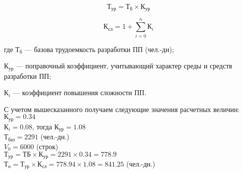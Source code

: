 \begin{equation}
    \textrm{Т}_{\textrm{ур}} = \textrm{Т}_{\textrm{б}} \times{} \textrm{К}_{\textrm{ур}}
\end{equation}

\begin{equation}
    \textrm{К}_{\textrm{сл}} = 1 + \sum_{i=0}^{n}\textrm{К}_i
\end{equation}
\begin{ESKDexplanation}
    \item[где ]{} $\textrm{Т}_{\textrm{б}}$ --- базова трудоемкость разработки ПП (чел.-дн);
    \item{} $\textrm{К}_{\textrm{ур}}$ --- поправочный коэффициент, учитывающий характер среды и средств разработки ПП;
    \item{} $\textrm{К}_i$ --- коэффициент повышения сложности ПП.
\end{ESKDexplanation}
С учетом вышесказанного получаем следующие значения расчетных величин: \\
$\textrm{К}_{\textrm{ур}} = 0.34$ \\
$\textrm{К}_i  =  0.08$,  тогда  $\textrm{К}_{\textrm{ур}} = 1.08$ \\
$\textrm{Т}_{\textrm{баз}} = 2291$ (чел.-дн.) \\
$V_0 = 6000$ (строк) \\
$\textrm{Т}_{\textrm{ур}} = \textrm{ТБ} \times{} \textrm{К}_{\textrm{ур}} = 2291 \times{} 0.34 = 778.9$ \\
$\textrm{Т}_{\textrm{о}} =  \textrm{Т}_{\textrm{ур}} \times{} \textrm{К}_{\textrm{сл}} = 778.94 \times{} 1.08 = 841.25$ (чел.-дн.) \\

